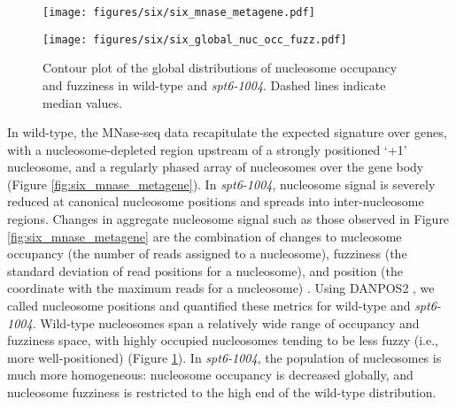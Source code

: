 \begin{figure}[H]
    \centering
    \begin{minipage}[t]{2.875in}
        \centering
        \texttt{[image: figures/six/six\_mnase\_metagene.pdf]}
        \caption[Average MNase-seq dyad signal in wild-type and \textit{spt6-1004}, over non-overlapping genes aligned by wild-type +1 nucleosome dyad.]{Average MNase-seq dyad signal in wild-type and \textit{spt6-1004}, over 3522 non-overlapping genes aligned by wild-type +1 nucleosome dyad. Values are the mean of spike-in normalized coverage in non-overlapping 20 bp bins, averaged over two replicates (\textit{spt6-1004}) or one experiment (wild-type). The solid line and shading are the median and the inter-quartile range.}
        \label{fig:six_mnase_metagene}
    \end{minipage}\hfill
    \begin{minipage}[t]{2.875in}
        \centering
        \texttt{[image: figures/six/six\_global\_nuc\_occ\_fuzz.pdf]}
        \caption[Contour plot of nucleosome occupancy and fuzziness in wild-type and \textit{spt6-1004}.]{Contour plot of the global distributions of nucleosome occupancy and fuzziness in wild-type and \textit{spt6-1004}. Dashed lines indicate median values.}
        \label{fig:six_global_nuc_occ_fuzz}
    \end{minipage}
\end{figure}

In wild-type, the MNase-seq data recapitulate the expected signature over genes, with a nucleosome-depleted region upstream of a strongly positioned `+1' nucleosome, and a regularly phased array of nucleosomes over the gene body (Figure \ref{fig:six_mnase_metagene}).
In \textit{spt6-1004}, nucleosome signal is severely reduced at canonical nucleosome positions and spreads into inter-nucleosome regions.
Changes in aggregate nucleosome signal such as those observed in Figure \ref{fig:six_mnase_metagene} are the combination of changes to nucleosome occupancy (the number of reads assigned to a nucleosome), fuzziness (the standard deviation of read positions for a nucleosome), and position (the coordinate with the maximum reads for a nucleosome) \citep{chen2013}.
Using DANPOS2 \citep{chen2013}, we called nucleosome positions and quantified these metrics for wild-type and \textit{spt6-1004}.
Wild-type nucleosomes span a relatively wide range of occupancy and fuzziness space, with highly occupied nucleosomes tending to be less fuzzy (i.e., more well-positioned) (Figure \ref{fig:six_global_nuc_occ_fuzz}).
In \textit{spt6-1004}, the population of nucleosomes is much more homogeneous: nucleosome occupancy is decreased globally, and nucleosome fuzziness is restricted to the high end of the wild-type distribution.

